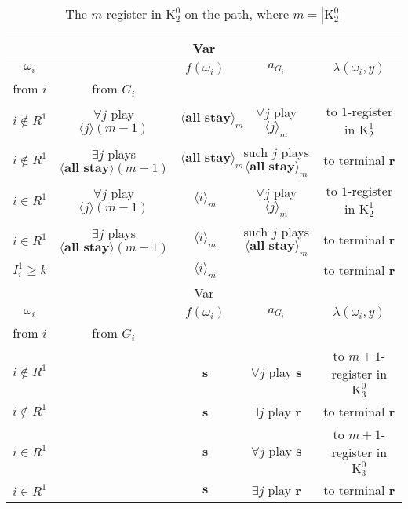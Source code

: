 \documentclass[12pt,letter]{article}
\newcommand{\Kappa}{\mathrm{K}}
\theoremstyle{definition}
\theoremstyle{remark}
\theoremstyle{claim}
\begin{document}
\begin{table}[!htbp]
\caption{The $m$-register in $\Kappa^0_{2}$ on the path, where $m=|\Kappa^0_2|$}
\begin{center}
\begin{tabular}{c c | c | c | c}
\hline
\multicolumn{5}{c}{Var}\\
\hline
$\omega_i$ 	 & 	   &	$f(\omega_i)$  &	$a_{G_i}$ & $\lambda(\omega_i,y)$ \\
\hline
\hline
from $i$ 	 & from $G_i$	  & 	&	 & \\
\hline
$i\notin R^1$  	& $\forall j$ play $\langle j \rangle(m-1)$    & $\langle \textbf{all stay} \rangle_m$	& $\forall j$ play $\langle j \rangle_m$	&to $1$-register in $\Kappa^1_{2}$\\
$i\notin R^1$  	& $\exists j$ plays $\langle \textbf{all stay} \rangle(m-1)$   & $\langle \textbf{all stay} \rangle_m$	& such $j$ plays $\langle \textbf{all stay} \rangle_m$	& to terminal \textbf{r}\\
$i\in R^1$  	& $\forall j$ play $\langle j \rangle(m-1)$ 	& $\langle i \rangle_m$	&  $\forall j$ play $\langle j \rangle_m$	&to $1$-register in $\Kappa^1_{2}$ \\
$i\in R^1$  	&  $\exists j$ plays $\langle \textbf{all stay} \rangle(m-1)$ 	& $\langle i \rangle_m$	& such $j$ plays $\langle \textbf{all stay} \rangle_m$	&  to terminal \textbf{r}\\
$I^1_i\geq k$  	& 	& $\langle i \rangle_m$	& 	&to terminal \textbf{r} \\
\hline
\multicolumn{5}{c}{Var}\\
\hline
$\omega_i$ 	 & 	   &	$f(\omega_i)$  &	$a_{G_i}$ & $\lambda(\omega_i,y)$ \\
\hline
\hline
from $i$ 	 & from $G_i$	  & 	&	 & \\
\hline
$i\notin R^1$  	&	& \textbf{s} & $\forall j$ play $\textbf{s}$ 	& to $m+1$-register in $\Kappa^0_{3}$\\
$i\notin R^1$  	&  & \textbf{s}  &  $\exists j$ play $\textbf{r}$  	& to terminal \textbf{r}\\
$i\in R^1$  	& 	 & \textbf{s}  &  $\forall j$ play $\textbf{s}$  	& to $m+1$-register in $\Kappa^0_{3}$\\
$i\in R^1$  	& 	& $\textbf{s}$	& $\exists j$ play $\textbf{r}$  & to terminal \textbf{r}\\
\hline
\end{tabular}
\end{center}
\end{table}
\end{document}
